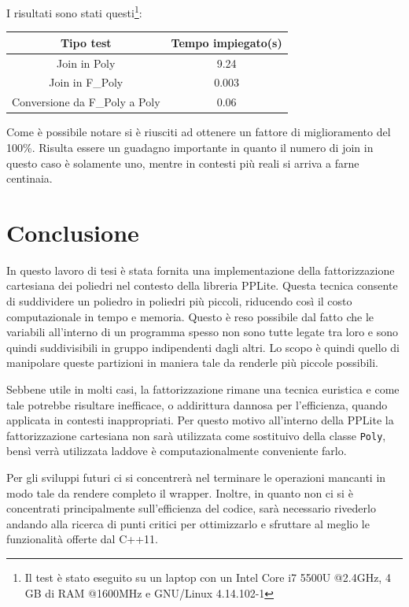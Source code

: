 \documentclass[italian]{mimosis}
\theoremstyle{definition}
\begin{document}
I risultati sono stati questi\footnote{Il test è stato eseguito su un laptop con un Intel Core i7 5500U
@2.4GHz, 4 GB di RAM @1600MHz e GNU/Linux 4.14.102-1}:
\begin{center}
\begin{tabular}{cc} \toprule
    \textbf{Tipo test} & \textbf{Tempo impiegato(s)}  \\ \midrule
    {Join in Poly}  & 9.24  \\
    {Join in F\_Poly}  & 0.003   \\
    {Conversione da F\_Poly a Poly}  & 0.06   \\ \bottomrule
\end{tabular}
\end{center}

Come è possibile notare si è riusciti ad ottenere un fattore di miglioramento
del 100\%. Risulta essere un guadagno importante in quanto il numero di join in
questo caso è solamente uno, mentre in contesti più reali si arriva a farne centinaia.
\chapter{Conclusione}
\label{sec:orgbb9a784}
In questo lavoro di tesi è stata fornita una implementazione della
fattorizzazione cartesiana dei poliedri nel contesto della libreria PPLite.
Questa tecnica consente di suddividere un poliedro in poliedri più piccoli, riducendo così il
costo computazionale in tempo e memoria. Questo è reso possibile dal fatto che
le variabili all'interno di un programma spesso non sono tutte legate tra loro e
sono quindi suddivisibili in gruppo indipendenti dagli altri. Lo scopo è quindi
quello di manipolare queste partizioni in maniera tale da renderle più piccole
possibili.

Sebbene utile in molti casi, la fattorizzazione rimane una tecnica euristica
e come tale potrebbe risultare inefficace, o addirittura dannosa per
l'efficienza, quando applicata in contesti inappropriati. Per questo motivo
all'interno della PPLite la fattorizzazione cartesiana non sarà utilizzata come
sostituivo della classe \texttt{Poly}, bensì verrà utilizzata laddove è
computazionalmente conveniente farlo.

Per gli sviluppi futuri ci si concentrerà nel terminare le operazioni mancanti
in modo tale da rendere completo il wrapper. Inoltre, in quanto non ci si è
concentrati principalmente sull'efficienza del codice, sarà necessario rivederlo
andando alla ricerca di punti critici per ottimizzarlo e sfruttare al
meglio le funzionalità offerte dal C++11.


\renewcommand\bibname{Bibliografia}

\end{document}
